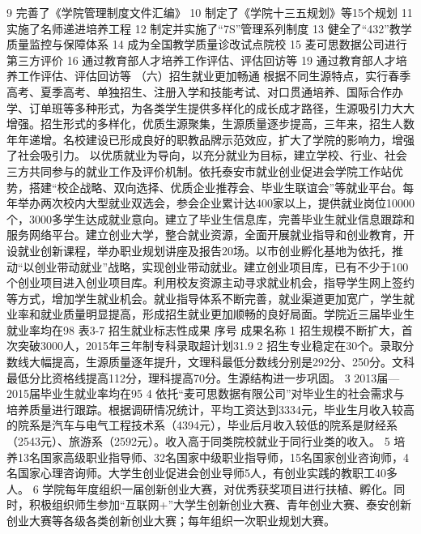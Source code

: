 9
完善了《学院管理制度文件汇编》
10
制定了《学院十三五规划》等15个规划
11
实施了名师递进培养工程
12
制定并实施了“7S”管理系列制度
13
健全了“432”教学质量监控与保障体系
14
成为全国教学质量诊改试点院校
15
麦可思数据公司进行第三方评价
16
通过教育部人才培养工作评估、评估回访等
19
通过教育部人才培养工作评估、评估回访等
（六）招生就业更加畅通
根据不同生源特点，实行春季高考、夏季高考、单独招生、注册入学和技能考试、对口贯通培养、国际合作办学、订单班等多种形式，为各类学生提供多样化的成长成才路径，生源吸引力大大增强。招生形式的多样化，优质生源聚集，生源质量逐步提高，三年来，招生人数年年递增。名校建设已形成良好的职教品牌示范效应，扩大了学院的影响力，增强了社会吸引力。
以优质就业为导向，以充分就业为目标，建立学校、行业、社会三方共同参与的就业工作及评价机制。依托泰安市就业创业促进会学院工作站优势，搭建“校企战略、双向选择、优质企业推荐会、毕业生联谊会”等就业平台。每年举办两次校内大型就业双选会，参会企业累计达400家以上，提供就业岗位10000个，3000多学生达成就业意向。建立了毕业生信息库，完善毕业生就业信息跟踪和服务网络平台。建立创业大学，整合就业资源，全面开展就业指导和创业教育，开设就业创新课程，举办职业规划讲座及报告20场。以市创业孵化基地为依托，推动“以创业带动就业”战略，实现创业带动就业。建立创业项目库，已有不少于100个创业项目进入创业项目库。利用校友资源主动寻求就业机会，指导学生网上签约等方式，增加学生就业机会。就业指导体系不断完善，就业渠道更加宽广，学生就业率和就业质量明显提高，形成招生就业更加顺畅的良好局面。学院近三届毕业生就业率均在98%
表3-7 招生就业标志性成果
序号
成果名称
1
招生规模不断扩大，首次突破3000人，2015年三年制专科录取超计划31.9%
2
招生专业稳定在30个。录取分数线大幅提高，生源质量逐年提升，文理科最低分数线分别是292分、250分。文科最低分比资格线提高112分，理科提高70分。生源结构进一步巩固。
3
2013届—2015届毕业生就业率均在95%
4
依托“麦可思数据有限公司”对毕业生的社会需求与培养质量进行跟踪。根据调研情况统计，平均工资达到3334元，毕业生月收入较高的院系是汽车与电气工程技术系（4394元），毕业后月收入较低的院系是财经系（2543元）、旅游系（2592元）。收入高于同类院校就业于同行业类的收入。
5
培养13名国家高级职业指导师、32名国家中级职业指导师，15名国家创业咨询师，4名国家心理咨询师。大学生创业促进会创业导师5人，有创业实践的教职工40多人。
6
学院每年度组织一届创新创业大赛，对优秀获奖项目进行扶植、孵化。同时，积极组织师生参加“互联网+”大学生创新创业大赛、青年创业大赛、泰安创新创业大赛等各级各类创新创业大赛；每年组织一次职业规划大赛。
